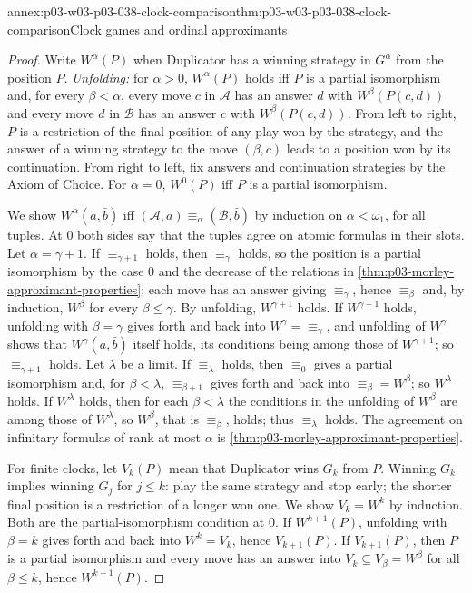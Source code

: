 \begin{annexitem}{annex:p03-w03-p03-038-clock-comparison}{thm:p03-w03-p03-038-clock-comparison}{Clock games and ordinal approximants}
\begin{proof}
Write \(W^\alpha(P)\) when Duplicator has a winning strategy in \(G^\alpha\)
from the position \(P\). \emph{Unfolding:} for \(\alpha>0\), \(W^\alpha(P)\)
holds iff \(P\) is a partial isomorphism and, for every \(\beta<\alpha\), every
move \(c\) in \(\mathcal A\) has an answer \(d\) with \(W^\beta(P(c,d))\) and
every move \(d\) in \(\mathcal B\) has an answer \(c\) with \(W^\beta(P(c,d))\).
From left to right, \(P\) is a restriction of the final position of any play
won by the strategy, and the answer of a winning strategy to the move
\((\beta,c)\) leads to a position won by its continuation. From right to left,
fix answers and continuation strategies by the Axiom of Choice. For
\(\alpha=0\), \(W^0(P)\) iff \(P\) is a partial isomorphism.

We show \(W^\alpha(\bar a,\bar b)\) iff
\((\mathcal A,\bar a)\equiv_\alpha(\mathcal B,\bar b)\) by induction on
\(\alpha<\omega_1\), for all tuples. At \(0\) both sides say that the tuples
agree on atomic formulas in their slots. Let \(\alpha=\gamma+1\). If
\(\equiv_{\gamma+1}\) holds, then \(\equiv_\gamma\) holds, so the position is a
partial isomorphism by the case \(0\) and the decrease of the relations in
\cref{thm:p03-morley-approximant-properties}; each move has an answer giving
\(\equiv_\gamma\), hence \(\equiv_\beta\) and, by induction, \(W^\beta\) for
every \(\beta\le\gamma\). By unfolding, \(W^{\gamma+1}\) holds. If
\(W^{\gamma+1}\) holds, unfolding with \(\beta=\gamma\) gives forth and back
into \(W^\gamma={\equiv_\gamma}\), and unfolding of \(W^\gamma\) shows that
\(W^\gamma(\bar a,\bar b)\) itself holds, its conditions being among those of
\(W^{\gamma+1}\); so \(\equiv_{\gamma+1}\) holds. Let \(\lambda\) be a limit.
If \(\equiv_\lambda\) holds, then \(\equiv_0\) gives a partial isomorphism and,
for \(\beta<\lambda\), \(\equiv_{\beta+1}\) gives forth and back into
\(\equiv_\beta=W^\beta\); so \(W^\lambda\) holds. If \(W^\lambda\) holds, then
for each \(\beta<\lambda\) the conditions in the unfolding of \(W^\beta\) are
among those of \(W^\lambda\), so \(W^\beta\), that is \(\equiv_\beta\), holds;
thus \(\equiv_\lambda\) holds. The agreement on infinitary formulas of rank at
most \(\alpha\) is \cref{thm:p03-morley-approximant-properties}.

For finite clocks, let \(V_k(P)\) mean that Duplicator wins \(G_k\) from
\(P\). Winning \(G_{k}\) implies winning \(G_j\) for \(j\le k\): play the same
strategy and stop early; the shorter final position is a restriction of a
longer won one. We show \(V_k=W^k\) by induction. Both are the
partial-isomorphism condition at \(0\). If \(W^{k+1}(P)\), unfolding with
\(\beta=k\) gives forth and back into \(W^k=V_k\), hence \(V_{k+1}(P)\). If
\(V_{k+1}(P)\), then \(P\) is a partial isomorphism and every move has an answer
into \(V_k\subseteq V_\beta=W^\beta\) for all \(\beta\le k\), hence
\(W^{k+1}(P)\).


\end{proof}
\end{annexitem}
